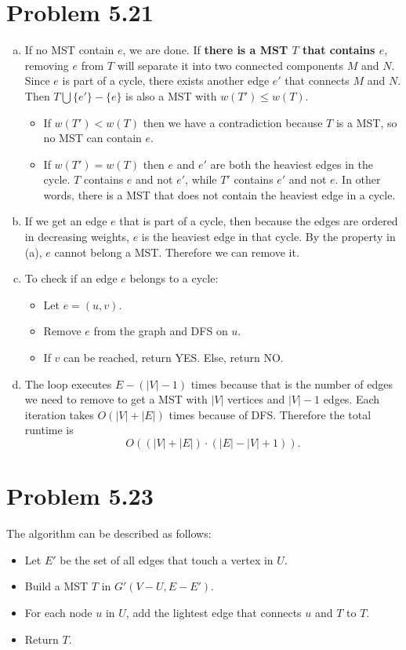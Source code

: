 \documentclass[12pt]{report}
\begin{document}
\section{Problem 5.21}
\begin{enumerate}[(a)]
\item If no MST contain $e$, we are done. If {\bf there is a MST $T$ that contains $e$}, removing $e$ from $T$ will separate it into two connected components $M$ and $N$. Since $e$ is part of a cycle, there exists another edge $e'$ that connects $M$ and $N$. Then $T \bigcup \{ e' \} - \{e\}$ is also a MST with $w(T') \le w(T)$. 
\begin{itemize}
  \item If $w(T') < w(T)$ then we have a contradiction because $T$ is a MST, so no MST can contain $e$. 
  \item If $w(T') = w(T)$ then $e$ and $e'$ are both the heaviest edges in the cycle. $T$ contains $e$ and not $e'$, while $T'$ contains $e'$ and not $e$. In other words, there is a MST that does not contain the heaviest edge in a cycle.
\end{itemize}
\item If we get an edge $e$ that is part of a cycle, then because the edges are ordered in decreasing weights, $e$ is the heaviest edge in that cycle. By the property in (a), $e$ cannot belong a MST. Therefore we can remove it.
\item To check if an edge $e$ belongs to a cycle:
  \begin{itemize}
    \item Let $e = (u,v)$.
    \item Remove $e$ from the graph and DFS on $u$.
    \item If $v$ can be reached, return YES. Else, return NO.
  \end{itemize}
\item The loop executes $E - (|V| - 1)$ times because that is the number of edges we need to remove to get a MST with $|V|$ vertices and $|V| - 1$ edges. Each iteration takes $O(|V| + |E|)$ times because of DFS. Therefore the total runtime is $$O( (|V| + |E|) \cdot (|E| - |V| + 1)).$$
\end{enumerate}


\section{Problem 5.23}
The algorithm can be described as follows:
\begin{itemize}
  \item Let $E'$ be the set of all edges that touch a vertex in $U$.
  \item Build a MST $T$ in $G'(V - U, E - E')$.
  \item For each node $u$ in $U$, add the lightest edge that connects $u$ and $T$ to $T$.
  \item Return $T$.
\end{itemize}
\end{document}
